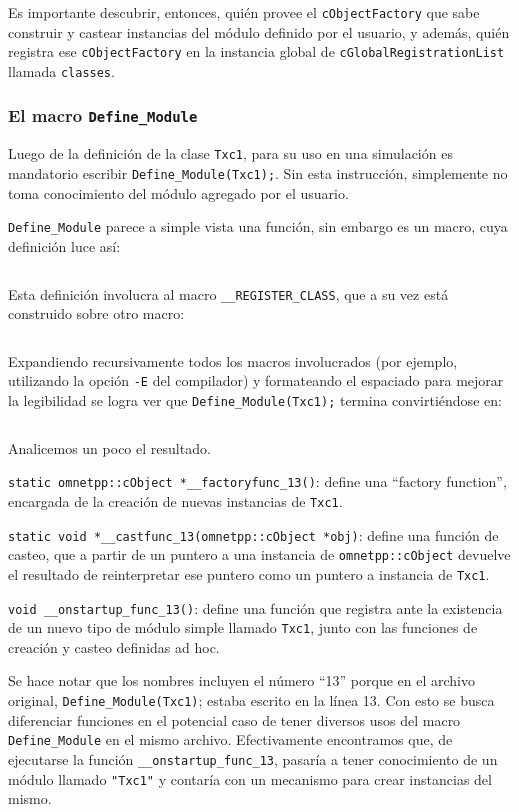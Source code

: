 \documentclass[]{article}
\begin{document}
Es importante descubrir, entonces, quién provee el \verb!cObjectFactory! que
sabe construir y castear instancias del módulo definido por el usuario, y
además, quién registra ese \verb!cObjectFactory! en la instancia global de
\verb!cGlobalRegistrationList! llamada \verb!classes!.

\subsubsection{El macro \texttt{Define\_Module}}

Luego de la definición de la clase \verb!Txc1!, para su uso en una simulación
es mandatorio escribir \verb!Define_Module(Txc1);!. Sin esta instrucción,
\omnetpp{} simplemente no toma conocimiento del módulo agregado por el usuario.

\verb!Define_Module! parece a simple vista una función, sin embargo es un
macro, cuya definición luce así:

\inputminted{c++}{codelistings/define_module_1.cc}

Esta definición involucra al macro \verb!__REGISTER_CLASS!, que a su vez está
construido sobre otro macro:

\inputminted{c++}{codelistings/define_module_2.cc}

Expandiendo recursivamente todos los macros involucrados (por ejemplo,
utilizando la opción \verb!-E! del compilador) y formateando el espaciado para
mejorar la legibilidad se logra ver que \verb!Define_Module(Txc1);! termina
convirtiéndose en:

\inputminted{c++}{codelistings/define_module_3.cc}

Analicemos un poco el resultado.

\verb!static omnetpp::cObject *__factoryfunc_13()!: define una ``factory
function'', encargada de la creación de nuevas instancias de \verb!Txc1!.

\verb!static void *__castfunc_13(omnetpp::cObject *obj)!: define una función de
casteo, que a partir de un puntero a una instancia de \verb!omnetpp::cObject!
devuelve el resultado de reinterpretar ese puntero como un puntero a instancia
de \verb!Txc1!.

\verb!void __onstartup_func_13()!: define una función que registra ante \omnetpp{}
la existencia de un nuevo tipo de módulo simple llamado \verb!Txc1!, junto con
las funciones de creación y casteo definidas ad hoc.

Se hace notar que los nombres incluyen el número ``13'' porque en el archivo
original, \verb!Define_Module(Txc1)!; estaba escrito en la línea 13. Con esto
se busca diferenciar funciones en el potencial caso de tener diversos usos del
macro \verb!Define_Module! en el mismo archivo. Efectivamente encontramos que,
de ejecutarse la función \verb!__onstartup_func_13!, \omnetpp{} pasaría a tener
conocimiento de un módulo llamado \verb!"Txc1"! y contaría con un mecanismo
para crear instancias del mismo.
\end{document}
